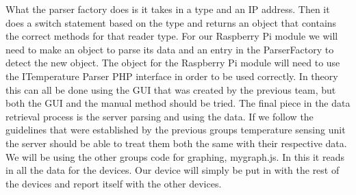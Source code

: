 \documentclass{report}
\begin{document}
What the parser factory does is it takes in a type and an IP address.
Then it does a switch statement based on the type and returns an object that contains the correct methods for that reader type.
For our Raspberry Pi module we will need to make an object to parse its data and an entry in the ParserFactory to detect the new object.
The object for the Raspberry Pi module will need to use the ITemperature Parser PHP interface in order to be used correctly.
In theory this can all be done using the GUI that was created by the previous team, but both the GUI and the manual method should be tried.
\newline
\indent
The final piece in the data retrieval process is the server parsing and using the data. 
If we follow the guidelines that were established by the previous groups temperature sensing unit the server should be able to treat them both the same with their respective data.
We will be using the other groups code for graphing, mygraph.js.
In this it reads in all the data for the devices. 
Our device will simply be put in with the rest of the devices and report itself with the other devices.
\newline
\indent
\newpage
\end{document}
